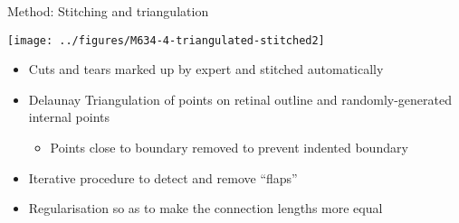 \documentclass{article}
\newcommand{\frametitle}[1]{{\vspace{0.1in}\color{blue}\Huge #1}\\\vspace{0.2in}}
\renewenvironment{frame}{\pagebreak[4]\LARGE

}{}
\begin{document}


  

  

\begin{frame}
  \frametitle{Method: Stitching and triangulation}
  
\texttt{[image: ../figures/M634-4-triangulated-stitched2]}
  
\begin{itemize}
\item Cuts and tears marked up by expert and stitched automatically
\item Delaunay Triangulation of points on retinal outline and
  randomly-generated internal points
  \begin{itemize}
  \item Points close to boundary removed to prevent indented boundary
    \citep{MaCaEtal99flat}
  \end{itemize}
\item Iterative procedure to detect and remove ``flaps''
\item Regularisation so as to make the connection lengths more equal
\end{itemize}

  
\end{frame}
\end{document}
